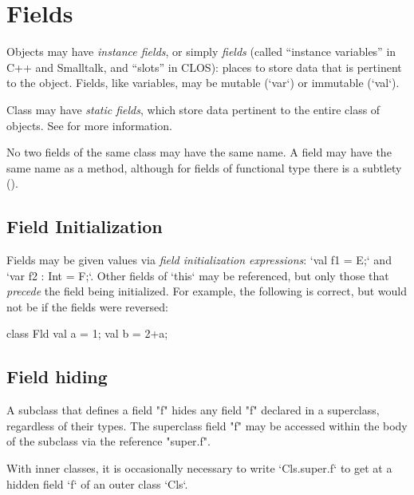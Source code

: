 \section{Fields}
\label{FieldDefinitions}

Objects may have {\em instance fields}, or simply {\em fields} (called
``instance variables'' in C++ and Smalltalk, and ``slots'' in CLOS): places to
store data that is pertinent to the object.  Fields, like variables, may be
mutable (\xcd`var`) or immutable (\xcd`val`).  

Class may have {\em static fields}, which store data pertinent to the
entire class of objects.  
See  for more information.

No two fields of the same class may have the same name.  A field may have the
same name as a method, although for fields of functional type there is a
subtlety ().  

\subsection{Field Initialization}

Fields may be given values via {\em field initialization expressions}:
\xcd`val f1 = E;` and \xcd`var f2 : Int = F;`. Other fields of \xcd`this` may
be referenced, but only those that {\em precede} the field being initialized.
For example, the following is correct, but would not be if the fields were
reversed:

\begin{xten}
class Fld{
  val a = 1;
  val b = 2+a;
}
\end{xten}
%


\subsection{Field hiding}


A subclass that defines a field \xcd"f" hides any field \xcd"f"
declared in a superclass, regardless of their types.  The
superclass field \xcd"f" may be accessed within the body of
the subclass via the reference \xcd"super.f".

With inner classes, it is occasionally necessary to 
write \xcd`Cls.super.f` to get at a hidden field \xcd`f` of an outer class
\xcd`Cls`. 

